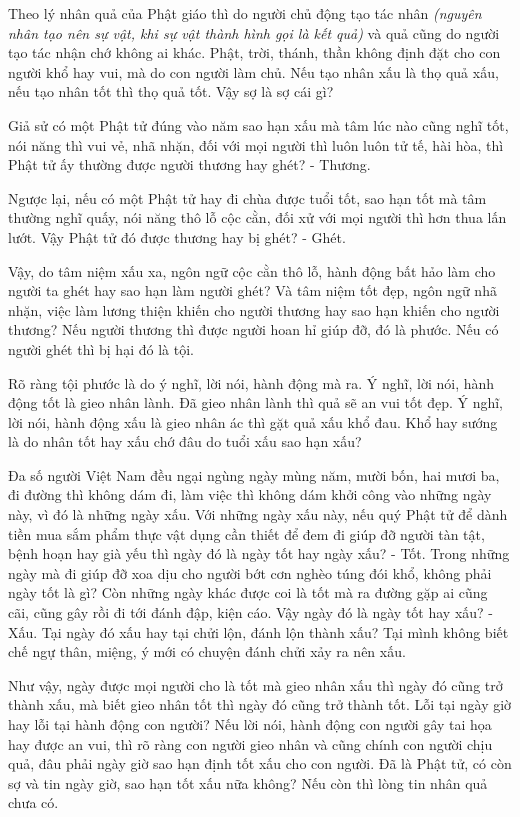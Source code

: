 \documentclass[
  12pt,
  oneside]{book}
\begin{document}
Theo lý nhân quả của Phật giáo thì do người chủ động tạo tác nhân \emph{(nguyên nhân tạo nên sự vật, khi sự vật thành hình gọi là kết quả)} và quả cũng do người tạo tác nhận chớ không ai khác. Phật, trời, thánh, thần không định đặt cho con người khổ hay vui, mà do con người làm chủ. Nếu tạo nhân xấu là thọ quả xấu, nếu tạo nhân tốt thì thọ quả tốt. Vậy sợ là sợ cái gì?

Giả sử có một Phật tử đúng vào năm sao hạn xấu mà tâm lúc nào cũng nghĩ tốt, nói năng thì vui vẻ, nhã nhặn, đối với mọi người thì luôn luôn tử tế, hài hòa, thì Phật tử ấy thường được người thương hay ghét? - Thương.

Ngược lại, nếu có một Phật tử hay đi chùa được tuổi tốt, sao hạn tốt mà tâm thường nghĩ quấy, nói năng thô lỗ cộc cằn, đối xử với mọi người thì hơn thua lấn lướt. Vậy Phật tử đó được thương hay bị ghét? - Ghét.

Vậy, do tâm niệm xấu xa, ngôn ngữ cộc cằn thô lỗ, hành động bất hảo làm cho người ta ghét hay sao hạn làm người ghét? Và tâm niệm tốt đẹp, ngôn ngữ nhã nhặn, việc làm lương thiện khiến cho người thương hay sao hạn khiến cho người thương? Nếu người thương thì được người hoan hỉ giúp đỡ, đó là phước. Nếu có người ghét thì bị hại đó là tội.

Rõ ràng tội phước là do ý nghĩ, lời nói, hành động mà ra. Ý nghĩ, lời nói, hành động tốt là gieo nhân lành. Đã gieo nhân lành thì quả sẽ an vui tốt đẹp. Ý nghĩ, lời nói, hành động xấu là gieo nhân ác thì gặt quả xấu khổ đau. Khổ hay sướng là do nhân tốt hay xấu chớ đâu do tuổi xấu sao hạn xấu?

Đa số người Việt Nam đều ngại ngùng ngày mùng năm, mười bốn, hai mươi ba, đi đường thì không dám đi, làm việc thì không dám khởi công vào những ngày này, vì đó là những ngày xấu. Với những ngày xấu này, nếu quý Phật tử để dành tiền mua sắm phẩm thực vật dụng cần thiết để đem đi giúp đỡ người tàn tật, bệnh hoạn hay già yếu thì ngày đó là ngày tốt hay ngày xấu? - Tốt. Trong những ngày mà đi giúp đỡ xoa dịu cho người bớt cơn nghèo túng đói khổ, không phải ngày tốt là gì? Còn những ngày khác được coi là tốt mà ra đường gặp ai cũng cãi, cũng gây rồi đi tới đánh đập, kiện cáo. Vậy ngày đó là ngày tốt hay xấu? - Xấu. Tại ngày đó xấu hay tại chửi lộn, đánh lộn thành xấu? Tại mình không biết chế ngự thân, miệng, ý mới có chuyện đánh chửi xảy ra nên xấu.

Như vậy, ngày được mọi người cho là tốt mà gieo nhân xấu thì ngày đó cũng trở thành xấu, mà biết gieo nhân tốt thì ngày đó cũng trở thành tốt. Lỗi tại ngày giờ hay lỗi tại hành động con người? Nếu lời nói, hành động con người gây tai họa hay được an vui, thì rõ ràng con người gieo nhân và cũng chính con người chịu quả, đâu phải ngày giờ sao hạn định tốt xấu cho con người. Đã là Phật tử, có còn sợ và tin ngày giờ, sao hạn tốt xấu nữa không? Nếu còn thì lòng tin nhân quả chưa có.
\end{document}
